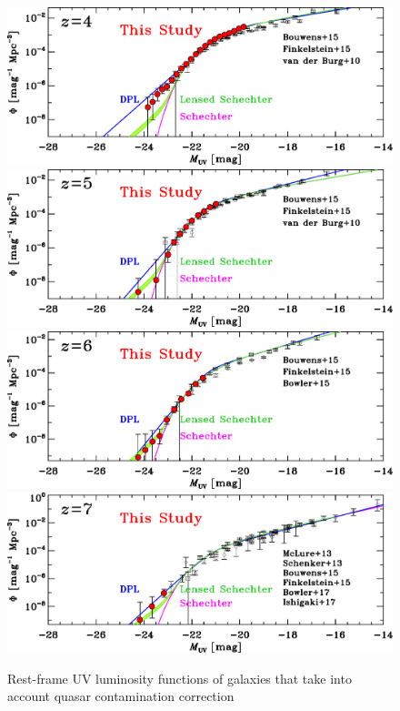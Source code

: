 \documentclass[]{pasj01}
\begin{document}
\begin{figure}
 \begin{center}
  \includegraphics[width=14cm]{lumi_func_z4.eps} 
  \includegraphics[width=14cm]{lumi_func_z5.eps} 
  \includegraphics[width=14cm]{lumi_func_z6.eps} 
  \includegraphics[width=14cm]{lumi_func_z7.eps} 
 \end{center}
\caption{
Rest-frame UV luminosity functions of galaxies that take into account quasar contamination correction 
}
\end{figure}
\end{document}
